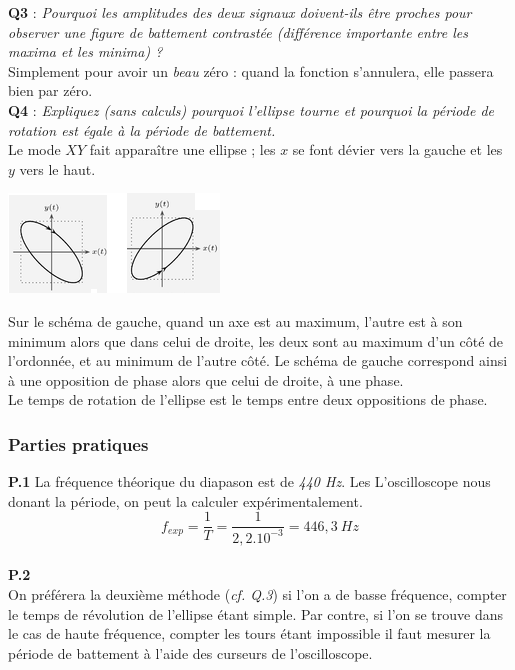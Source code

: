 \documentclass	[11pt, a4paper, openany]{book}
\begin{document}
		\textbf{Q3} : \textit{Pourquoi les amplitudes des deux signaux doivent-ils être proches pour observer une figure de battement contrastée (différence importante entre les maxima et les minima) ?}\\
		Simplement pour avoir un \textit{beau} zéro : quand la fonction s'annulera, elle passera bien par zéro.\\
		
		\textbf{Q4} : \textit{Expliquez (sans calculs) pourquoi l'ellipse tourne et pourquoi la période de rotation est égale à la période de battement.}\\
		Le mode $XY$ fait apparaître une ellipse ; les $x$ se font dévier vers la gauche et les $y$ vers le haut.
		\begin{center}
			\includegraphics[scale=1]{labo/image2.png}
		\end{center}
		Sur le schéma de gauche, quand un axe est au maximum, l'autre est à son minimum alors que dans celui de droite, les deux sont au maximum d'un côté de l'ordonnée, et au minimum de l'autre côté. Le schéma de gauche correspond ainsi à une opposition de phase alors que celui de droite, à une phase. \\
		Le temps de rotation de l'ellipse est le temps entre deux oppositions de phase.
		
		\subsubsection*{Parties pratiques}
		\textbf{P.1} La fréquence théorique du diapason est de \textit{440 Hz}. Les L'oscilloscope nous donant la période, on peut la calculer expérimentalement.
		\begin{equation}
			f_{exp} = \frac{1}{T} = \frac{1}{2,2 . 10^{-3}} = 446,3\ Hz
		\end{equation}
		\ \\
		
		\textbf{P.2}\\
		On préférera la deuxième méthode (\textit{cf. Q.3})  si l'on a de basse fréquence, compter le temps de révolution de l'ellipse étant simple. Par contre, si l'on se trouve dans le cas de haute fréquence, compter les tours étant impossible il faut mesurer la période de battement à l'aide des curseurs de l'oscilloscope.\\
		
\end{document}
